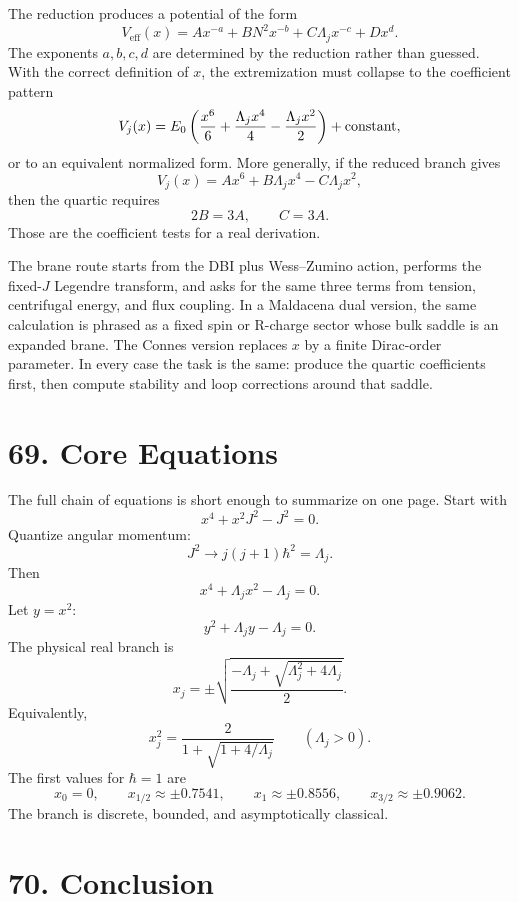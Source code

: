 \documentclass[11pt]{article}
\newcommand{\Lspin}{\Lambda_j}
\newcommand{\hb}{\hbar}
\begin{document}
The reduction produces a potential of the form
\[
        V_{\text{eff}}(x)
        =
        A x^{-a}
        +B N^2 x^{-b}
        +C\Lspin x^{-c}
        +D x^d .
\]
The exponents \(a,b,c,d\) are determined by the reduction rather than guessed. With the correct definition of \(x\), the extremization must collapse to the coefficient pattern
\[
        V_j(x)=E_0
        \left(
        \frac{x^6}{6}
        +\frac{\Lspin x^4}{4}
        -\frac{\Lspin x^2}{2}
        \right)+{\rm constant},
\]
or to an equivalent normalized form. More generally, if the reduced branch gives
\[
        V_j(x)=A x^6+B\Lspin x^4-C\Lspin x^2,
\]
then the quartic requires
\[
        2B=3A,\qquad C=3A .
\]
Those are the coefficient tests for a real derivation.

The brane route starts from the DBI plus Wess--Zumino action, performs the fixed-\(J\) Legendre transform, and asks for the same three terms from tension, centrifugal energy, and flux coupling. In a Maldacena dual version, the same calculation is phrased as a fixed spin or R-charge sector whose bulk saddle is an expanded brane. The Connes version replaces \(x\) by a finite Dirac-order parameter. In every case the task is the same: produce the quartic coefficients first, then compute stability and loop corrections around that saddle.

\section*{69. Core Equations}

The full chain of equations is short enough to summarize on one page. Start with
\[
        x^4+x^2J^2-J^2=0 .
\]
Quantize angular momentum:
\[
        J^2\to j(j+1)\hb^2=\Lspin .
\]
Then
\[
        x^4+\Lspin x^2-\Lspin=0 .
\]
Let \(y=x^2\):
\[
        y^2+\Lspin y-\Lspin=0 .
\]
The physical real branch is
\[
        x_j=\pm
        \sqrt{
        \frac{-\Lspin+\sqrt{\Lspin^2+4\Lspin}}{2}
        } .
\]
Equivalently,
\[
        x_j^2=
        \frac{2}{1+\sqrt{1+4/\Lspin}}
        \qquad
        (\Lspin>0).
\]
The first values for \(\hb=1\) are
\[
        x_0=0,\qquad
        x_{1/2}\approx\pm0.7541,\qquad
        x_1\approx\pm0.8556,\qquad
        x_{3/2}\approx\pm0.9062 .
\]
The branch is discrete, bounded, and asymptotically classical.


\section*{70. Conclusion}
\end{document}
